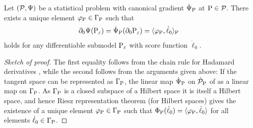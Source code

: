 \documentclass[a4,danish]{article}
\begin{document}

\begin{proposition}
  \label{prop:repr-can-gradient}
  Let $(\mathcal{P}, \TT)$ be a statistical problem with canonical gradient
  $\dot{\mathcal{\TT}}_{\P}$ at $\P \in \mathcal{P}$. There exists a unique element
  $\phi_{\P} \in \Gamma_{\P}$ such that
  \begin{equation}
    \label{eq:2}
    \partial_0{\TT(\P_{\epsilon})}
    = \mathrm{\dot{\TT}_{\P}}
    {\left(
        \partial_{0}{\P_{\epsilon}} 
      \right)}
    = \langle \phi_{\P}, \dot{\ell}_0 \rangle_{\P}
  \end{equation}
  holds for any differentiable submodel $\P_{\epsilon}$ with score function $\dot{\ell}_0$.
\end{proposition}

\begin{proof}[Sketch of proof]
  The first equality follows from the chain rule for Hadamard derivatives
  \citep[chp.~20]{van2000asymptotic}, while the second follows from the arguments given above: If
  the tangent space can be represented as $\Gamma_{\P}$, the linear map $\dot{\TT}_{\P}$ on
  $\dot{\mathcal{P}}_{\P}$  of as a linear map
  on $\Gamma_{\P}$. As $\Gamma_{\P}$ is a closed subspace of a Hilbert space it is itself a Hilbert
  space, and hence Riesz representation theorem (for Hilbert spaces) gives the existence of a unique
  element $\phi_{\P} \in \Gamma_{\P}$ such that
  $\Phi_{\P}(\dot{\ell}_0) = \langle\phi_{\P}, \dot{\ell}_0\rangle$ for all elements
  $\dot{\ell}_0 \in \Gamma_{\P}$.
\end{proof}
\end{document}
